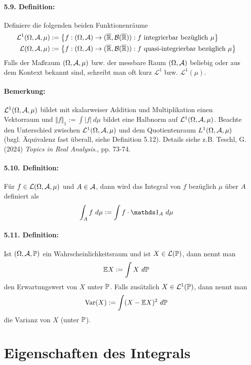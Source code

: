 \documentclass[12pt]{report}
\begin{document}
 \paragraph{5.9. Definition:}Definiere die folgenden beiden Funktionenr\"aume
 \begin{align*}
     \mathcal{L}^1(\Omega,\mathcal{A},\mu)&:=\left\{f:(\Omega,\mathcal{A})\to(\overline{\mathbb{R}},\mathcal{B}(\overline{\mathbb{R}})):f\text{ integrierbar bez\"uglich } \mu \right\} \\
     \mathcal{L}(\Omega,\mathcal{A},\mu)&:=\left\{f:(\Omega,\mathcal{A})\to(\overline{\mathbb{R}},\mathcal{B}(\overline{\mathbb{R}})):f\text{ quasi-integrierbar bez\"uglich } \mu \right\}
 \end{align*}
 Falls der Ma\ss{}raum $(\Omega,\mathcal{A},\mu)$ bzw. der messbare Raum $(\Omega,\mathcal{A})$ beliebig oder aus dem Kontext bekannt sind, schreibt man oft kurz $\mathcal{L}^1$ bzw. $\mathcal{L}^1(\mu)$.
 
 \paragraph{Bemerkung:}$\mathcal{L}^1(\Omega,\mathcal{A},\mu)$ bildet mit skalarweiser Addition und Multiplikation einen Vektorraum und $\Vert f\Vert_1:=\displaystyle\int |f|\ d\mu$ bildet eine Halbnorm auf $\mathcal{L}^1(\Omega,\mathcal{A},\mu)$. Beachte den Unterschied zwischen $\mathcal{L}^1(\Omega,\mathcal{A},\mu)$ und dem Quotientenraum $L^1(\Omega,\mathcal{A},\mu)$ (bzgl. \"Aquivalenz fast \"uberall, siehe Definition 5.12). Details siehe z.B. Teschl, G. (2024) \textit{Topics in Real Analysis}., pp. 73-74. 
 
 \paragraph{5.10. Definition:}F\"ur $f\in\mathcal{L}(\Omega,\mathcal{A},\mu)$ und $A\in\mathcal{A}$, dann wird das Integral von $f$ bez\"uglich $\mu$ \"uber $A$ definiert als
 $$\int_A f\ d\mu:=\int f\cdot\ind{A}\ d\mu$$
 
 \paragraph{5.11. Definition:}Ist $(\Omega, \mathcal{A}, \mathbb{P})$ ein Wahrscheinlichkeitsraum und ist $X\in \mathcal{L}(\mathbb{P})$, dann nennt man 
 $$\mathbb{E} X:=\int X\ d\mathbb{P}$$
 den Erwartungswert von $X$ unter $\mathbb{P}$. Falls zus\"atzlich $X\in\mathcal{L}^1(\mathbb{P})$, dann nennt man
 $$\operatorname{Var}(X):=\int (X-\E X)^2\ d\Pp$$
 die Varianz von $X$ (unter $\mathbb{P}$).
 
 \section*{Eigenschaften des Integrals}
  
\end{document}
